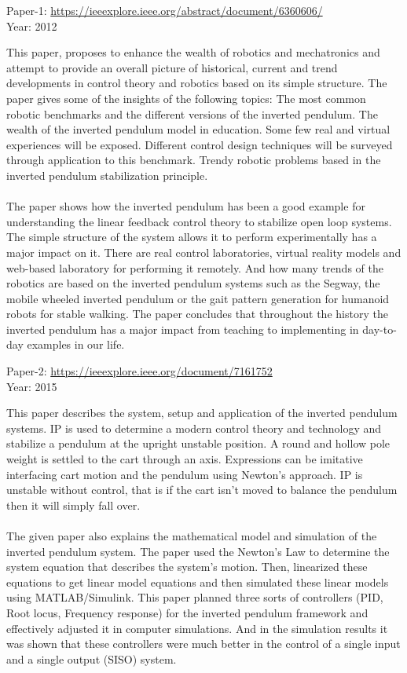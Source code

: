 \documentclass[11pt]{article}
\begin{document}
\newpage
\begin{flushleft}
{\large Paper-1:}{ \url{ https://ieeexplore.ieee.org/abstract/document/6360606/}\\
Year: 2012}
\end{flushleft}
{This paper, proposes to enhance the wealth of robotics and mechatronics and attempt to provide an overall picture of historical, current and trend developments in control theory and robotics based on its simple structure. The paper gives some of the insights of the following topics: The most common robotic benchmarks and the different versions of the inverted pendulum. The wealth of the inverted pendulum model in education. Some few real and virtual experiences will be exposed. Different control design techniques will be surveyed through application to this benchmark. Trendy robotic problems based in the inverted pendulum stabilization principle.\\\\}
{The paper shows how the inverted pendulum has been a good example for understanding the linear feedback control theory to stabilize open loop systems. The simple structure of the system allows it to perform experimentally has a major impact on it. There are real control laboratories, virtual reality models and web-based laboratory for performing it remotely. And how many trends of the robotics are based on the inverted pendulum systems such as the Segway, the mobile wheeled inverted pendulum or the gait pattern generation for humanoid robots for stable walking. The paper concludes that throughout the history the inverted pendulum has a major impact from teaching to implementing in day-to-day examples in our life.
\\}
\begin{flushleft}
{\large Paper-2:}{ \url{ https://ieeexplore.ieee.org/document/7161752}\\
Year: 2015}
\end{flushleft}
{This paper describes the system, setup and application of the inverted pendulum systems.  IP is used to determine a modern control theory and technology and stabilize a pendulum at the upright unstable position. A round and hollow pole weight is settled to the cart through an axis. Expressions can be imitative interfacing cart motion and the pendulum using Newton's approach. IP is unstable without control, that is if the cart isn't moved to balance the pendulum then it will simply fall over. \\\\
The given paper also explains the mathematical model and simulation of the inverted pendulum system. The paper used the Newton’s Law to determine the system equation that describes the system’s motion. Then, linearized these equations to get linear model equations and then simulated these linear models using MATLAB/Simulink. This paper planned three sorts of controllers (PID, Root locus, Frequency response) for the inverted pendulum framework and effectively adjusted it in computer simulations. And in the simulation results it was shown that these controllers were much better in the control of a single input and a single output (SISO) system.
}
\end{document}
